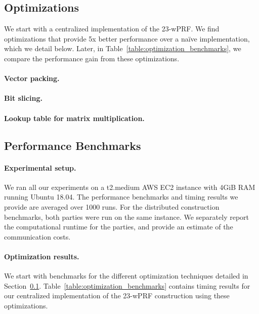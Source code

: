 \subsection{Optimizations}
\label{subsec:implementation_opt}
We start with a centralized implementation of the 23-wPRF. We find optimizations that provide 5x better performance over a na\"ive implementation, which we detail below. Later, in Table~\ref{table:optimization_benchmarks}, we compare the performance gain from these optimizations.
\paragraph{Vector packing.}
\paragraph{Bit slicing.}
\paragraph{Lookup table for matrix multiplication.}


\subsection{Performance Benchmarks}
\paragraph{Experimental setup.}
We ran all our experiments on a t2.medium AWS EC2 instance with 4GiB RAM  running Ubuntu 18.04. The performance benchmarks and timing results we provide are averaged over 1000 runs. For the distributed construction benchmarks, both parties were run on the same instance. We separately report the computational runtime for the parties, and provide an estimate of the communication costs. 

\paragraph{Optimization results.}
We start with benchmarks for the different optimization techniques detailed in Section~\ref{subsec:implementation_opt}. Table~\ref{table:optimization_benchmarks} contains timing results for our centralized implementation of the 23-wPRF construction using these optimizations.

